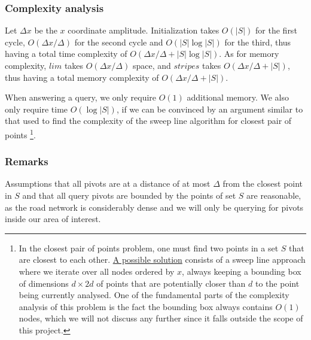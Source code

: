 \subsubsection{Complexity analysis}
Let $\Delta x$ be the $x$ coordinate amplitude. Initialization takes $O(|S|)$ for the first cycle, $O(\Delta x / \Delta)$ for the second cycle and $O(|S| \log |S|)$ for the third, thus having a total time complexity of $O(\Delta x / \Delta + |S| \log |S|)$. As for memory complexity, $lim$ takes $O(\Delta x / \Delta)$ space, and $stripes$ takes $O(\Delta x / \Delta + |S|)$, thus having a total memory complexity of $O(\Delta x / \Delta + |S|)$.\par
When answering a query, we only require $O(1)$ additional memory. We also only require time $O(\log |S|)$, if we can be convinced by an argument similar to that used to find the complexity of the \gls{sweep line} algorithm for closest pair of points \footnote{In the closest pair of points problem, one must find two points in a set $S$ that are closest to each other. \href{https://www.cs.mcgill.ca/~cs251/ClosestPair/ClosestPairPS.html}{A possible solution} consists of a sweep line approach where we iterate over all nodes ordered by $x$, always keeping a bounding box of dimensions $d \times 2d$ of points that are potentially closer than $d$ to the point being currently analysed. One of the fundamental parts of the complexity analysis of this problem is the fact the bounding box always contains $O(1)$ nodes, which we will not discuss any further since it falls outside the scope of this project.}.
\subsubsection{Remarks}
Assumptions that all pivots are at a distance of at most $\Delta$ from the closest point in $S$ and that all query pivots are bounded by the points of set $S$ are reasonable, as the road network is considerably dense and we will only be querying for pivots inside our area of interest.